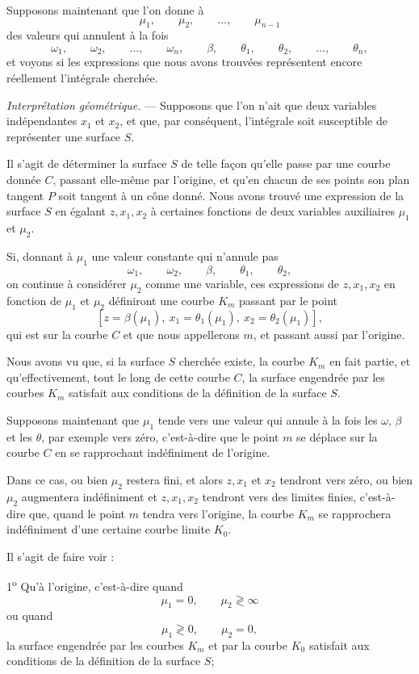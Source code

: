 \documentclass[11pt]{article}
\begin{document}
Supposons maintenant que l’on donne à
\[
\mu_1,\qquad \mu_2,\qquad \ldots,\qquad \mu_{n-1}
\]
des valeurs qui annulent à la fois
\[
\omega_1,\qquad \omega_2,\qquad \ldots,\qquad \omega_n,\qquad \beta,\qquad \theta_1,\qquad \theta_2,\qquad \ldots,\qquad \theta_n,
\]
et voyons si les expressions que nous avons trouvées représentent encore réellement l’intégrale cherchée.

\emph{Interprétation géométrique.} --- Supposons que l’on n’ait que deux variables indépendantes $x_1$ et $x_2$, et que, par conséquent, l’intégrale soit susceptible de représenter une surface $S$.

Il s’agit de déterminer la surface $S$ de telle façon qu’elle passe par une courbe donnée $C$, passant elle-même par l’origine, et qu’en chacun de ses points son plan tangent $P$ soit tangent à un cône donné. Nous avons trouvé une expression de la surface $S$ en égalant $z,x_1,x_2$ à certaines fonctions de deux variables auxiliaires $\mu_1$ et $\mu_2$.

Si, donnant à $\mu_1$ une valeur constante qui n’annule pas
\[
\omega_1,\qquad \omega_2,\qquad \beta,\qquad \theta_1,\qquad \theta_2,
\]
on continue à considérer $\mu_2$ comme une variable, ces expressions de $z,x_1,x_2$ en fonction de $\mu_1$ et $\mu_2$ définiront une courbe $K_m$ passant par le point
\[
[z=\beta(\mu_1),\ x_1=\theta_1(\mu_1),\ x_2=\theta_2(\mu_1)],
\]
qui est sur la courbe $C$ et que nous appellerons $m$, et passant aussi par l’origine.

Nous avons vu que, si la surface $S$ cherchée existe, la courbe $K_m$ en fait partie, et qu’effectivement, tout le long de cette courbe $C$, la surface engendrée par les courbes $K_m$ satisfait aux conditions de la définition de la surface $S$.

Supposons maintenant que $\mu_1$ tende vers une valeur qui annule à la fois les $\omega$, $\beta$ et les $\theta$, par exemple vers zéro, c’est-à-dire que le point $m$ se déplace sur la courbe $C$ en se rapprochant indéfiniment de l’origine.

Dans ce cas, ou bien $\mu_2$ restera fini, et alors $z,x_1$ et $x_2$ tendront vers zéro, ou bien $\mu_2$ augmentera indéfiniment et $z,x_1,x_2$ tendront vers des limites finies, c’est-à-dire que, quand le point $m$ tendra vers l’origine, la courbe $K_m$ se rapprochera indéfiniment d’une certaine courbe limite $K_0$.

Il s’agit de faire voir :

1\textsuperscript{o} Qu’à l’origine, c’est-à-dire quand
\[
\mu_1=0,
\qquad
\mu_2\gtrless\infty
\]
ou quand
\[
\mu_1\gtrless0,
\qquad
\mu_2=0,
\]
la surface engendrée par les courbes $K_m$ et par la courbe $K_0$ satisfait aux conditions de la définition de la surface $S$;
\end{document}
